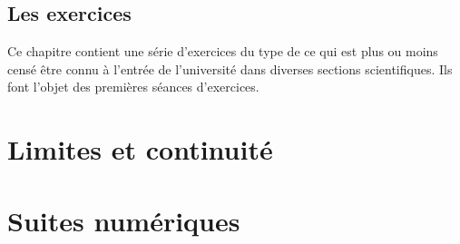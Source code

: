 \subsection{Les exercices}

Ce chapitre contient une série d'exercices du type de ce qui est plus ou moins censé être connu à l'entrée de l'université dans diverses sections scientifiques. Ils font l'objet des premières séances d'exercices.





\section{Limites et continuité}


\section{Suites numériques}



